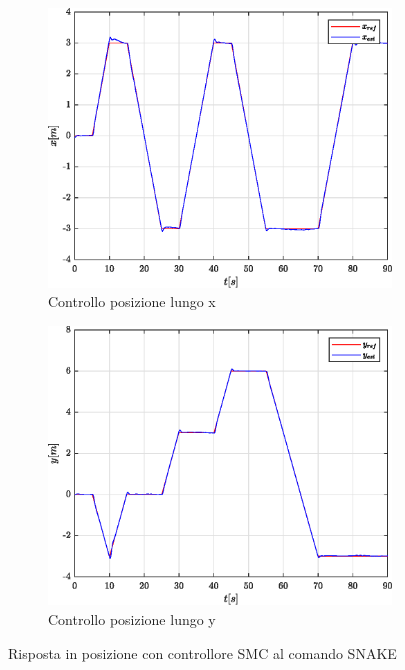 \begin{figure}
	\centering
	\begin{subfigure}{0.45\textwidth}
		\centering
		\includegraphics[width=1\textwidth]{Simulazioni/Figure/SMC/SNAKE/PositionControlXPos}
		\caption{Controllo posizione lungo x}
		\label{fig:SNAKEerrposxSMC}
	\end{subfigure}
	\hfill
	\begin{subfigure}{0.45\textwidth}
		\centering
		\includegraphics[width=1\textwidth]{Simulazioni/Figure/SMC/SNAKE/PositionControlYPos}
		\caption{Controllo posizione lungo y}
		\label{fig:SNAKEerrposySMC}
	\end{subfigure}
	\caption{Risposta in posizione con controllore SMC al comando SNAKE}
\end{figure}

